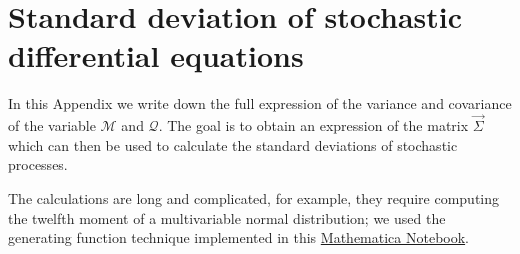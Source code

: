 \chapter[Standard deviation of SDEs]{Standard deviation of stochastic differential equations}
\label{app:std_sde}
In this Appendix we write down the full expression of the variance and covariance of the variable \(\mathcal{M}\)
and \(\mathcal{Q}\). The goal is to obtain an expression of the matrix \(\vec{\Sigma}\) 
which can then be used to calculate the standard deviations of stochastic processes.

The calculations are long and complicated, for example, they require computing the twelfth moment of a multivariable normal distribution;
we used the generating function technique implemented in this \href{https://github.com/arn4/master-thesis/blob/main/analytical-calculations%20/isserlis.nb}{Mathematica Notebook}.

